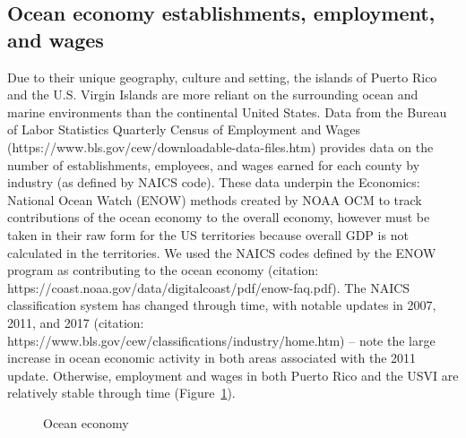 \documentclass[
  letterpaper,
  oneside,
  open=any]{scrbook}
\begin{document}
\subsection{Ocean economy establishments, employment, and
wages}\label{ocean-economy-establishments-employment-and-wages}

Due to their unique geography, culture and setting, the islands of
Puerto Rico and the U.S. Virgin Islands are more reliant on the
surrounding ocean and marine environments than the continental United
States. Data from the Bureau of Labor Statistics Quarterly Census of
Employment and Wages
(https://www.bls.gov/cew/downloadable-data-files.htm) provides data on
the number of establishments, employees, and wages earned for each
county by industry (as defined by NAICS code). These data underpin the
Economics: National Ocean Watch (ENOW) methods created by NOAA OCM to
track contributions of the ocean economy to the overall economy, however
must be taken in their raw form for the US territories because overall
GDP is not calculated in the territories. We used the NAICS codes
defined by the ENOW program as contributing to the ocean economy
(citation: https://coast.noaa.gov/data/digitalcoast/pdf/enow-faq.pdf).
The NAICS classification system has changed through time, with notable
updates in 2007, 2011, and 2017 (citation:
https://www.bls.gov/cew/classifications/industry/home.htm) -- note the
large increase in ocean economic activity in both areas associated with
the 2011 update. Otherwise, employment and wages in both Puerto Rico and
the USVI are relatively stable through time (Figure~\ref{fig-NAICS}).

\begin{figure}


\caption{\label{fig-NAICS}Ocean economy}

\end{figure}%
\end{document}
